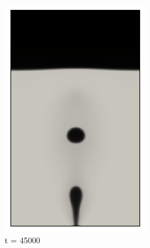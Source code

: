 \begin{figure}[H]
\begin{subfigure}{0.25\textwidth}
		\includegraphics[width=\linewidth]{figs/cap4/bb_760_s45}
		\caption{t = 45000}
		\label{fig:8}
	\end{subfigure}\hfil 
	\begin{subfigure}{0.25\textwidth}

\end{subfigure}
\end{figure}
